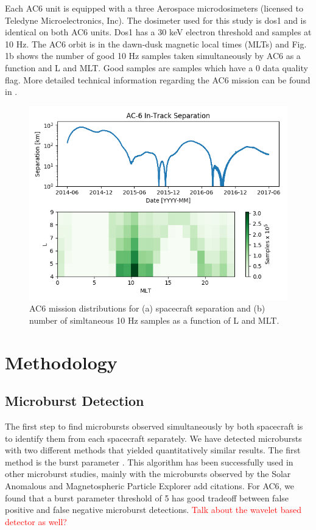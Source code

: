 \documentclass[draft]{agujournal2019}
\begin{document}
Each AC6 unit is equipped with a three Aerospace microdosimeters (licensed to Teledyne Microelectronics, Inc). The dosimeter used for this study is dos1 and is identical on both AC6 units. Dos1 has a 30 keV electron threshold and samples at 10 Hz. The AC6 orbit is in the dawn-dusk magnetic local times (MLTs) and Fig. 1b shows the number of good 10 Hz samples taken simultaneously by AC6 as a function and L and MLT. Good samples are samples which have a 0 data quality flag. More detailed technical information regarding the AC6 mission can be found in .

\begin{figure}
\includegraphics[width=\textwidth]{fig1.png}
\caption{AC6 mission distributions for (a) spacecraft separation and (b) number of simltaneous 10 Hz samples as a function of L and MLT.} \label{fig1}
\end{figure}

\section{Methodology}
\subsection{Microburst Detection}
The first step to find microbursts observed simultaneously by both spacecraft is to identify them from each spacecraft separately. We have detected microbursts with two different methods that yielded quantitatively similar results. The first method is the burst parameter \cite{O'Brien2003}. This algorithm has been successfully used in other microburst studies, mainly with the microbursts observed by the Solar Anomalous and Magnetospheric Particle Explorer add citations. For AC6, we found that a burst parameter threshold of 5 has good tradeoff between false positive and false negative microburst detections. \textcolor{red}{Talk about the wavelet based detector as well?}
\end{document}
